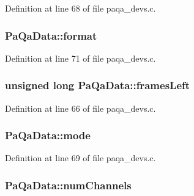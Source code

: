 Definition at line 68 of file paqa\+\_\+devs.\+c.

\subsubsection[{\texorpdfstring{format}{format}}]{ Pa\+Qa\+Data\+::format}\hypertarget{struct_pa_qa_data_a7cf2d968a7fd2249f7000451081303c2}{}\label{struct_pa_qa_data_a7cf2d968a7fd2249f7000451081303c2}


Definition at line 71 of file paqa\+\_\+devs.\+c.

\subsubsection[{\texorpdfstring{frames\+Left}{framesLeft}}]{\setlength{\rightskip}{0pt plus 5cm}unsigned long Pa\+Qa\+Data\+::frames\+Left}\hypertarget{struct_pa_qa_data_acafd715d7fe9865a0ed4ab9d9916b08d}{}\label{struct_pa_qa_data_acafd715d7fe9865a0ed4ab9d9916b08d}


Definition at line 66 of file paqa\+\_\+devs.\+c.

\subsubsection[{\texorpdfstring{mode}{mode}}]{ Pa\+Qa\+Data\+::mode}\hypertarget{struct_pa_qa_data_aeb5c74d657257a149a4898e4fa122578}{}\label{struct_pa_qa_data_aeb5c74d657257a149a4898e4fa122578}


Definition at line 69 of file paqa\+\_\+devs.\+c.

\subsubsection[{\texorpdfstring{num\+Channels}{numChannels}}]{ Pa\+Qa\+Data\+::num\+Channels}\hypertarget{struct_pa_qa_data_a4ec905802e0ca3da56cd7307d06e7544}{}\label{struct_pa_qa_data_a4ec905802e0ca3da56cd7307d06e7544}


